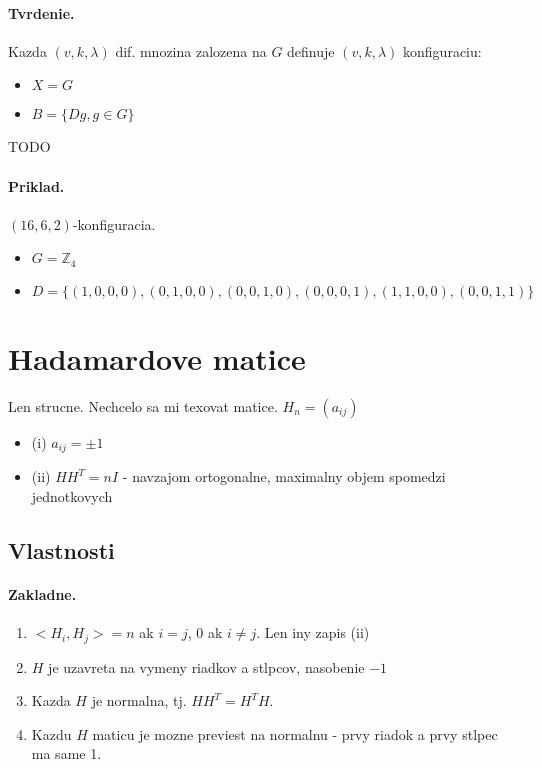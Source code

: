 \documentclass[10pt,a4paper]{article}
\begin{document}
\paragraph{Tvrdenie.} 
Kazda $(v,k,\lambda)$ dif. mnozina zalozena na $G$ definuje $(v,k,\lambda)$ konfiguraciu:
\begin{itemize}
\item $X = G$
\item $B=\{Dg, g \in G\}$
\end{itemize}
TODO

\paragraph{Priklad.}
$(16,6,2)$-konfiguracia. 
\begin{itemize}
\item $G=\mathbb{Z}_4$
\item $D=\{(1,0,0,0),(0,1,0,0),(0,0,1,0),(0,0,0,1),(1,1,0,0),(0,0,1,1)\}$
\end{itemize}

\section{Hadamardove matice}
Len strucne. Nechcelo sa mi texovat matice. 
$H_n = (a_{ij})$
\begin{itemize}
\item (i) $a_{ij} = \pm 1$
\item (ii) $HH^T = nI$ - navzajom ortogonalne, maximalny objem spomedzi jednotkovych
\end{itemize}

\subsection{Vlastnosti}
\paragraph{Zakladne.}
\begin{enumerate}
\item $<H_i, H_j> = n$ ak $i=j$, $0$ ak $i\neq j$. Len iny zapis (ii)
\item $H$ je uzavreta na vymeny riadkov a stlpcov, nasobenie $-1$
\item Kazda $H$ je normalna, tj. $HH^T = H^TH$.
\item Kazdu $H$ maticu je mozne previest na normalnu - prvy riadok a prvy stlpec ma same 1. 
\end{enumerate}
\end{document}
